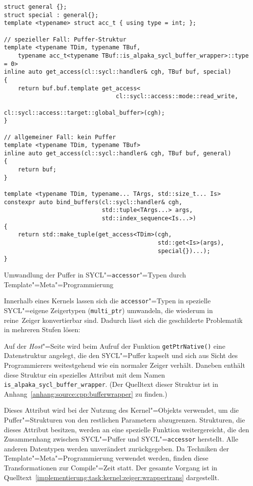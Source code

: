 \begin{code}
    \begin{verbatim}
struct general {};
struct special : general{};
template <typename> struct acc_t { using type = int; };

// spezieller Fall: Puffer-Struktur
template <typename TDim, typename TBuf,
    typename acc_t<typename TBuf::is_alpaka_sycl_buffer_wrapper>::type = 0>
inline auto get_access(cl::sycl::handler& cgh, TBuf buf, special)
{
    return buf.buf.template get_access<
                                cl::sycl::access::mode::read_write,
                                cl::sycl::access::target::global_buffer>(cgh);
}

// allgemeiner Fall: kein Puffer
template <typename TDim, typename TBuf>
inline auto get_access(cl::sycl::handler& cgh, TBuf buf, general)
{
    return buf;
}

template <typename TDim, typename... TArgs, std::size_t... Is>
constexpr auto bind_buffers(cl::sycl::handler& cgh,
                            std::tuple<TArgs...> args,
                            std::index_sequence<Is...>)
{
    return std::make_tuple(get_access<TDim>(cgh,
                                            std::get<Is>(args),
                                            special{})...);
}
    \end{verbatim}
    \caption{Umwandlung der Puffer in SYCL"=\texttt{accessor}"=Typen durch
             Template"=Meta"=Programmierung}
    \label{implementierung:task:kernel:zeiger:wrappertrans}
\end{code}

Innerhalb eines Kernels lassen sich die \texttt{accessor}"=Typen in spezielle
SYCL"=eigene Zeigertypen (\texttt{multi\_ptr}) umwandeln, die wiederum in
\glqq reine\grqq\ Zeiger konvertierbar sind. Dadurch lässt sich die geschilderte
Problematik in mehreren Stufen lösen:

Auf der \textit{Host}"=Seite wird beim Aufruf der Funktion
\texttt{getPtrNative()} eine Datenstruktur angelegt, die den SYCL"=Puffer
kapselt und sich aus Sicht des Programmierers weitestgehend wie ein normaler
Zeiger verhält. Daneben enthält diese Struktur ein spezielles Attribut mit dem
Namen \texttt{is\_alpaka\_sycl\_buffer\_wrapper}. (Der Quelltext dieser Struktur
ist in Anhang~\ref{anhang:source:cpp:bufferwrapper} zu finden.)

Dieses Attribut wird bei der Nutzung des Kernel"=Objekts verwendet, um die
Puffer"=Strukturen von den restlichen Parametern abzugrenzen. Strukturen, die
dieses Attribut besitzen, werden an eine spezielle Funktion weitergereicht, die
den Zusammenhang zwischen SYCL"=Puffer und SYCL"=\texttt{accessor} herstellt.
Alle anderen Datentypen werden unverändert zurückgegeben. Da Techniken der
Template"=Meta"=Programmierung verwendet werden, finden diese Transformationen
zur Compile"=Zeit statt. Der gesamte Vorgang ist in
Quelltext~\ref{implementierung:task:kernel:zeiger:wrappertrans} dargestellt.

